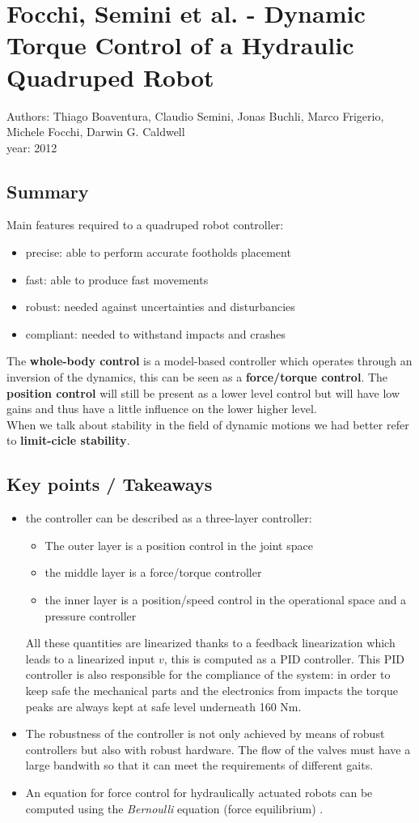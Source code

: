 \section{Focchi, Semini et al. - Dynamic Torque Control of a Hydraulic Quadruped Robot \cite{SeminiFocchi}}
Authors: Thiago Boaventura, Claudio Semini, Jonas Buchli, Marco Frigerio, Michele Focchi, Darwin G. Caldwell\\
year: 2012
\subsection*{Summary}
Main features required to a quadruped robot controller:
\begin{itemize}
\item precise: able to perform accurate footholds placement
\item fast: able to produce fast movements
\item robust: needed against uncertainties and disturbancies
\item compliant: needed to withstand impacts and crashes
\end{itemize}
The \textbf{whole-body control} is a model-based controller which operates through an inversion of the dynamics, this can be seen as a \textbf{force/torque control}. The \textbf{position control} will still be present as a lower level control but will have low gains and thus have a little influence on the lower higher level.\\
When we talk about stability in the field of dynamic motions we had better refer to \textbf{limit-cicle stability}.
\subsection*{Key points / Takeaways}
\begin{itemize}
\item the controller can be described as a three-layer controller:
\begin{itemize}
\item The outer layer is a position control in the joint space
\item the middle layer is a force/torque controller
\item the inner layer is a position/speed control in the operational space and a pressure controller
\end{itemize}
All these quantities are linearized thanks to a feedback linearization which leads to a linearized input $v$, this is computed as a PID controller. This PID controller is also responsible for the compliance of the system: in order to keep safe the mechanical parts and the electronics from impacts the torque peaks are always kept at safe level underneath 160 Nm.
\item The robustness of the controller is not only achieved by means of robust controllers but also with robust hardware. The flow of the valves must have a large bandwith so that it can meet the requirements of different gaits.
\item An equation for force control for hydraulically actuated robots can be computed using the \textit{Bernoulli} equation (force equilibrium) \cite{ThiagoSemini}. 
\end{itemize}

